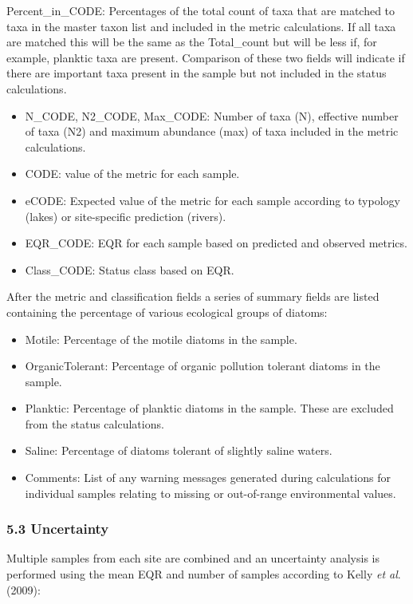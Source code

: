 \documentclass[]{article}
\begin{document}
Percent\_in\_CODE: Percentages of the total count of taxa that are
matched to taxa in the master taxon list and included in the metric
calculations. If all taxa are matched this will be the same as the
Total\_count but will be less if, for example, planktic taxa are
present. Comparison of these two fields will indicate if there are
important taxa present in the sample but not included in the status
calculations.

\begin{itemize}
\item
  N\_CODE, N2\_CODE, Max\_CODE: Number of taxa (N), effective number of
  taxa (N2) and maximum abundance (max) of taxa included in the metric
  calculations.
\item
  CODE: value of the metric for each sample.
\item
  eCODE: Expected value of the metric for each sample according to
  typology (lakes) or site-specific prediction (rivers).
\item
  EQR\_CODE: EQR for each sample based on predicted and observed
  metrics.
\item
  Class\_CODE: Status class based on EQR.
\end{itemize}

After the metric and classification fields a series of summary fields
are listed containing the percentage of various ecological groups of
diatoms:

\begin{itemize}
\item
  Motile: Percentage of the motile diatoms in the sample.
\item
  OrganicTolerant: Percentage of organic pollution tolerant diatoms in
  the sample.
\item
  Planktic: Percentage of planktic diatoms in the sample. These are
  excluded from the status calculations.
\item
  Saline: Percentage of diatoms tolerant of slightly saline waters.
\item
  Comments: List of any warning messages generated during calculations
  for individual samples relating to missing or out-of-range
  environmental values.
\end{itemize}

\subsubsection{5.3 Uncertainty}\label{uncertainty}

Multiple samples from each site are combined and an uncertainty analysis
is performed using the mean EQR and number of samples according to Kelly
\emph{et al}. (2009):
\end{document}
